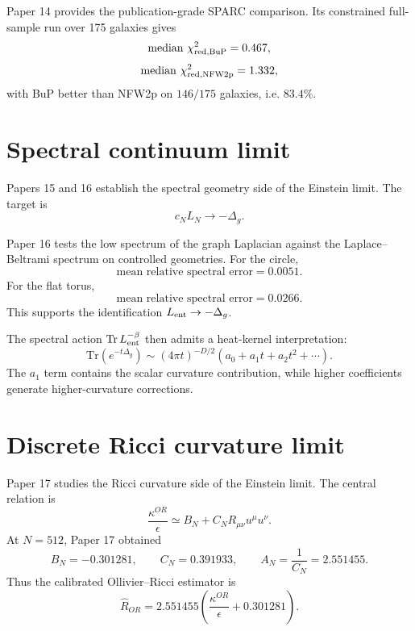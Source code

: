 \documentclass[11pt,a4paper]{article}
\begin{document}
Paper 14 provides the publication-grade SPARC comparison. Its constrained
full-sample run over 175 galaxies gives
\begin{equation}
  {\rm median}\ \chi^2_{\rm red,BuP}=0.467,
\end{equation}
\begin{equation}
  {\rm median}\ \chi^2_{\rm red,NFW2p}=1.332,
\end{equation}
with BuP better than NFW2p on \(146/175\) galaxies, i.e. \(83.4\%\).

\section{Spectral continuum limit}

Papers 15 and 16 establish the spectral geometry side of the Einstein limit.
The target is
\begin{equation}
  c_NL_N\to-\Delta_g.
\end{equation}

Paper 16 tests the low spectrum of the graph Laplacian against the
Laplace--Beltrami spectrum on controlled geometries. For the circle,
\begin{equation}
  \text{mean relative spectral error}=0.0051.
\end{equation}
For the flat torus,
\begin{equation}
  \text{mean relative spectral error}=0.0266.
\end{equation}
This supports the identification \(L_{\rm ent}\to-\Delta_g\).

The spectral action \(\mathrm{Tr}\,L_{\rm ent}^{-\beta}\) then admits a
heat-kernel interpretation:
\begin{equation}
  \mathrm{Tr}(e^{-t\Delta_g})
  \sim
  (4\pi t)^{-D/2}
  \left(
  a_0+a_1t+a_2t^2+\cdots
  \right).
\end{equation}
The \(a_1\) term contains the scalar curvature contribution, while higher
coefficients generate higher-curvature corrections.

\section{Discrete Ricci curvature limit}

Paper 17 studies the Ricci curvature side of the Einstein limit. The central
relation is
\begin{equation}
  \frac{\kappa^{OR}}{\epsilon}
  \simeq
  B_N+C_NR_{\mu\nu}u^\mu u^\nu.
\end{equation}
At \(N=512\), Paper 17 obtained
\begin{equation}
  B_N=-0.301281,
  \qquad
  C_N=0.391933,
  \qquad
  A_N=\frac{1}{C_N}=2.551455.
\end{equation}
Thus the calibrated Ollivier--Ricci estimator is
\begin{equation}
  \widehat R_{OR}
  =
  2.551455
  \left(
  \frac{\kappa^{OR}}{\epsilon}
  +
  0.301281
  \right).
\end{equation}
\end{document}

